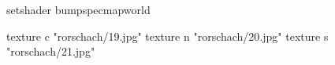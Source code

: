 setshader bumpspecmapworld

    texture c "rorschach/19.jpg"
    texture n "rorschach/20.jpg"
    texture s "rorschach/21.jpg"
